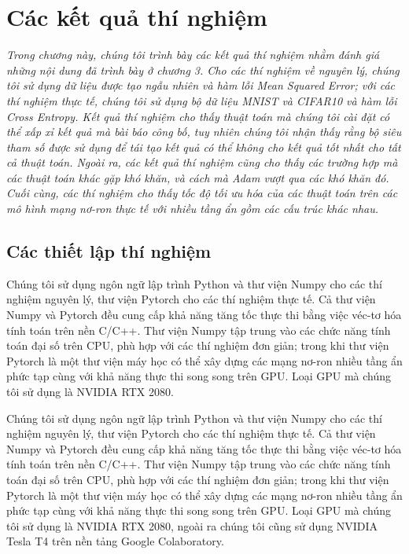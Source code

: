 \chapter{Các kết quả thí nghiệm}
\label{Chapter4}

\textit{Trong chương này, chúng tôi trình bày các kết quả thí nghiệm nhằm đánh giá những nội dung đã trình bày ở chương 3. Cho các thí nghiệm về nguyên lý, chúng tôi sử dụng dữ liệu được tạo ngẫu nhiên và hàm lỗi Mean Squared Error; với các thí nghiệm thực tế, chúng tôi sử dụng bộ dữ liệu MNIST và CIFAR10 và hàm lỗi Cross Entropy. Kết quả thí nghiệm cho thấy thuật toán mà chúng tôi cài đặt có thể xấp xỉ kết quả mà bài báo công bố, tuy nhiên chúng tôi nhận thấy rằng bộ siêu tham số được sử dụng để tái tạo kết quả có thể không cho kết quả tốt nhất cho tất cả thuật toán. Ngoài ra, các kết quả thí nghiệm cũng cho thấy các trường hợp mà các thuật toán khác gặp khó khăn, và cách mà Adam vượt qua các khó khăn đó. Cuối cùng, các thí nghiệm cho thấy tốc độ tối ưu hóa của các thuật toán trên các mô hình mạng nơ-ron thực tế với nhiều tầng ẩn gồm các cấu trúc khác nhau.}

\section{Các thiết lập thí nghiệm}

Chúng tôi sử dụng ngôn ngữ lập trình Python và thư viện Numpy cho các thí nghiệm nguyên lý, thư viện Pytorch cho các thí nghiệm thực tế. Cả thư viện Numpy và Pytorch đều cung cấp khả năng tăng tốc thực thi bằng việc véc-tơ hóa tính toán trên nền C/C++. Thư viện Numpy tập trung vào các chức năng tính toán đại số trên CPU, phù hợp với các thí nghiệm đơn giản; trong khi thư viện Pytorch là một thư viện máy học có thể xây dựng các mạng nơ-ron nhiều tầng ẩn phức tạp cùng với khả năng thực thi song song trên GPU. Loại GPU mà chúng tôi sử dụng là NVIDIA RTX 2080.

Chúng tôi sử dụng ngôn ngữ lập trình Python và thư viện Numpy cho các thí nghiệm nguyên lý, thư viện Pytorch cho các thí nghiệm thực tế. Cả thư viện Numpy và Pytorch đều cung cấp khả năng tăng tốc thực thi bằng việc véc-tơ hóa tính toán trên nền C/C++. Thư viện Numpy tập trung vào các chức năng tính toán đại số trên CPU, phù hợp với các thí nghiệm đơn giản; trong khi thư viện Pytorch là một thư viện máy học có thể xây dựng các mạng nơ-ron nhiều tầng ẩn phức tạp cùng với khả năng thực thi song song trên GPU. Loại GPU mà chúng tôi sử dụng là NVIDIA RTX 2080, ngoài ra chúng tôi cũng sử dụng NVIDIA Tesla T4 trên nền tảng Google Colaboratory.

